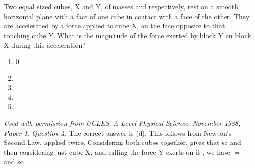 
\begin{problem}  %
{Two equal sized cubes, X and Y, of masses  and  respectively, rest on a smooth horizontal plane with a face of one cube in contact with a face of the other. They are accelerated by a force  applied to cube X, on the face opposite to that touching cube Y. What is the magnitude of the force exerted by block Y on block X during this acceleration?
\begin{enumerate}
	\item 0
	\item {}
	\item {}
	\item {} \answer
	\item {}
\end{enumerate}
}
{\textit{Used with permission from UCLES, A Level Physical Science, November 1988, Paper 1, Question 4.}}
{The correct answer is (d). This follows from Newton's Second Law, applied twice. Considering both cubes together,  gives that \value{F}{(m + 2m)a}{} so  and then considering just cube X, and calling the force Y exerts on it , we have \value{(F - R)}{ma}{} $=$  and so .}
\end{problem}